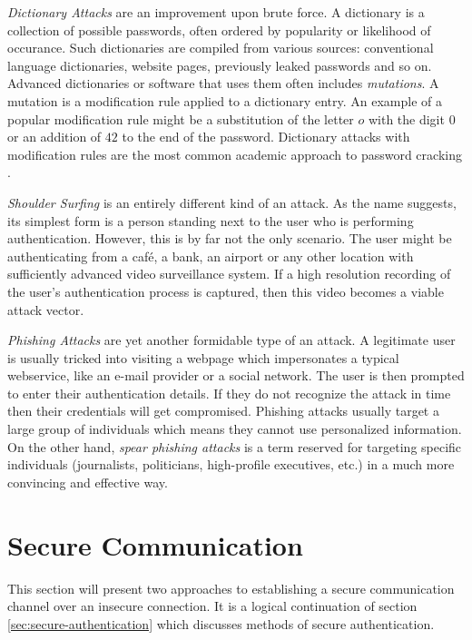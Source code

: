 \emph{Dictionary Attacks} are an improvement upon brute force. A dictionary is a collection of possible passwords, often ordered by popularity or likelihood of occurance. Such dictionaries are compiled from various sources: conventional language dictionaries, website pages, previously leaked passwords and so on. Advanced dictionaries or software that uses them often includes \emph{mutations}. A mutation is a modification rule applied to a dictionary entry. An example of a popular modification rule might be a substitution of the letter \(o\) with the digit \(0\) or an addition of \(42\) to the end of the password. Dictionary attacks with modification rules are the most common academic approach to password cracking \cite{zhang2010security, weir2010testing, kelley2012guess, shay2010encountering}.

\emph{Shoulder Surfing} \cite{raza:2012:password-attacks-survey, suo:2005:graphical-passwords-survey} is an entirely different kind of an attack. As the name suggests, its simplest form is a person standing next to the user who is performing authentication. However, this is by far not the only scenario. The user might be authenticating from a café, a bank, an airport or any other location with sufficiently advanced video surveillance system. If a high resolution recording of the user's authentication process is captured, then this video becomes a viable attack vector.

\emph{Phishing Attacks} \cite{hong2012state, Wu:2006:STA:1124772.1124863} are yet another formidable type of an attack. A legitimate user is usually tricked into visiting a webpage which impersonates a typical webservice, like an e-mail provider or a social network. The user is then prompted to enter their authentication details. If they do not recognize the attack in time then their credentials will get compromised. Phishing attacks usually target a large group of individuals which means they cannot use personalized information. On the other hand, \emph{spear phishing attacks} is a term reserved for targeting specific individuals (journalists, politicians, high-profile executives, etc.) in a much more convincing and effective way.

\section{Secure Communication}
\label{sec:secure-communication}

This section will present two approaches to establishing a secure communication channel over an insecure connection. It is a logical continuation of section \ref{sec:secure-authentication} which discusses methods of secure authentication.

